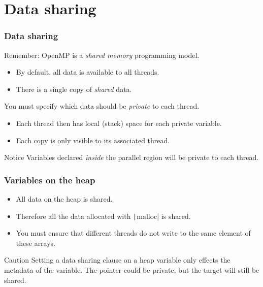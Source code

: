 \documentclass{beamer}
\begin{document}
\section{Data sharing}
\begin{frame}
\frametitle{Data sharing}
Remember: OpenMP is a \emph{shared memory} programming model.
\begin{itemize}
  \item By default, all data is available to all threads.
  \item There is a single copy of \emph{shared} data.
\end{itemize}

\vfill

You must specify which data should be \emph{private} to each thread.
\begin{itemize}
  \item Each thread then has local (stack) space for each private variable.
  \item Each copy is only visible to its associated thread.
\end{itemize}

\begin{block}{Notice}
Variables declared \emph{inside} the parallel region will be private to each thread.
\end{block}

\end{frame}


\begin{frame}
\frametitle{Variables on the heap}
\begin{itemize}
  \item All data on the heap is shared.
  \item Therefore all the data allocated with \texttt|malloc| is shared.
  \item You must ensure that different threads do not write to the same element of these arrays.
\end{itemize}

\begin{alertblock}{Caution}
Setting a data sharing clause on a heap variable only effects the metadata of the variable.
The pointer could be private, but the target will still be shared.
\end{alertblock}
\end{frame}


\end{document}
